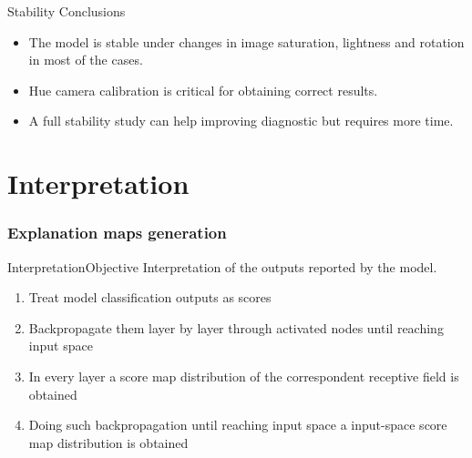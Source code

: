 \documentclass{beamer}
\begin{document}
\begin{frame}{Stability Conclusions}{}	
\begin{itemize}
	\item The model is stable under changes in image saturation, lightness and rotation in most of the cases.
	\item Hue camera calibration is critical for obtaining correct results.
	\item A full stability study can help improving diagnostic but requires more time.
\end{itemize}
\end{frame}

\part{Interpretation}

\section{Explanation maps generation}

\begin{frame}{Interpretation}{Objective}
Interpretation of the outputs reported by the model.
\begin{enumerate}
	\item Treat model classification outputs as scores
	\item Backpropagate them layer by layer through activated nodes until reaching input space
	\item In every layer a score map distribution of the correspondent receptive field is obtained
	\item Doing such backpropagation until reaching input space a input-space score map distribution is obtained
\end{enumerate}

\end{frame}
\end{document}
